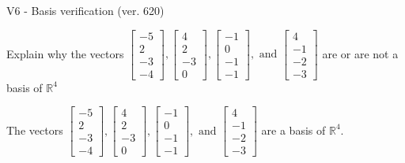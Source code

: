 \begin{exercise}
  \begin{exerciseTitle}V6 - Basis verification (ver. 620)\end{exerciseTitle}
  \begin{exerciseStatement}
    Explain why the vectors \(\left[\begin{array}{r}
-5 \\
2 \\
-3 \\
-4
\end{array}\right] , \left[\begin{array}{r}
4 \\
2 \\
-3 \\
0
\end{array}\right] , \left[\begin{array}{r}
-1 \\
0 \\
-1 \\
-1
\end{array}\right] , \text{ and } \left[\begin{array}{r}
4 \\
-1 \\
-2 \\
-3
\end{array}\right]\) are or are not a basis of \(\mathbb{R}^4\)	


  \end{exerciseStatement}
  \begin{exerciseAnswer}
   The vectors \(\left[\begin{array}{r}
-5 \\
2 \\
-3 \\
-4
\end{array}\right] , \left[\begin{array}{r}
4 \\
2 \\
-3 \\
0
\end{array}\right] , \left[\begin{array}{r}
-1 \\
0 \\
-1 \\
-1
\end{array}\right] , \text{ and } \left[\begin{array}{r}
4 \\
-1 \\
-2 \\
-3
\end{array}\right]\) 
  	 are  a basis of \(\mathbb{R}^4\).
  


  \end{exerciseAnswer}
\end{exercise}